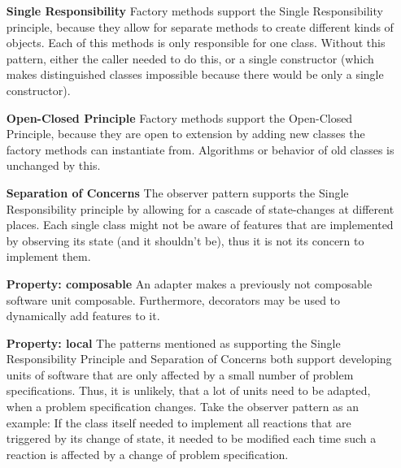 
\begin{enumerate}
    \item[\textbf{Single Responsibility}]
        Factory methods support the Single Responsibility principle, because they allow for separate methods to create different kinds of objects. Each of this methods is only responsible for one class. Without this pattern, either the caller needed to do this, or a single constructor (which makes distinguished classes impossible because there would be only a single constructor).

    \item[\textbf{Open-Closed Principle}]
        Factory methods support the Open-Closed Principle, because they are open to extension by adding new classes the factory methods can instantiate from. Algorithms or behavior of old classes is unchanged by this.

    \item[\textbf{Separation of Concerns}]
        The observer pattern supports the Single Responsibility principle by allowing for a cascade of state-changes at different places.
        Each single class might not be aware of features that are implemented by observing its state (and it shouldn't be), thus it is not its concern to implement them.

    \item[\textbf{Property: composable}]
        An adapter makes a previously not composable software unit composable.
        Furthermore, decorators may be used to dynamically add features to it.

    \item[\textbf{Property: local}]
        The patterns mentioned as supporting the Single Responsibility Principle and Separation of Concerns both support developing units of software that are only affected by a small number of problem specifications. Thus, it is unlikely, that a lot of units need to be adapted, when a problem specification changes. Take the observer pattern as an example: If the class itself needed to implement all reactions that are triggered by its change of state, it needed to be modified each time such a reaction is affected by a change of problem specification.

\end{enumerate}